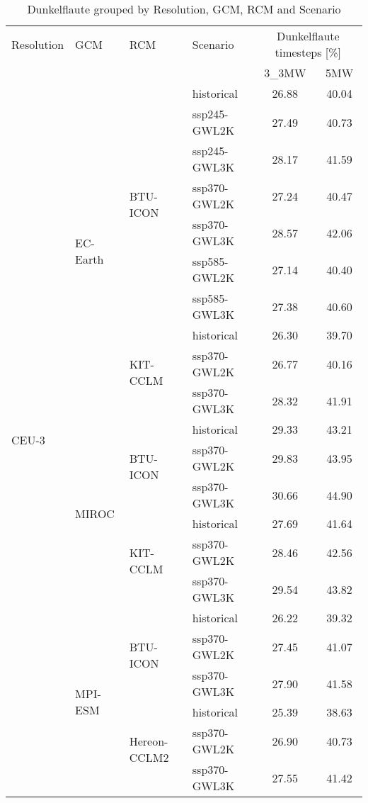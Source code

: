 \begin{table}[!htbp]
\centering
\footnotesize
\caption{Dunkelflaute grouped by Resolution, GCM, RCM and Scenario}
\label{Table:Dunkelflaute_changes}
\begin{tabular}{lll|l|cc}
\toprule
Resolution & GCM & RCM & Scenario & \multicolumn{2}{c}{Dunkelflaute timesteps [\%]} \\
 & & & & 3\_3MW & 5MW \\
\midrule
\multirow{22}{*}{CEU-3} & \multirow{10}{*}{EC-Earth} & \multirow{7}{*}{BTU-ICON} & historical & 26.88 & 40.04 \\
 &  &  & ssp245-GWL2K & 27.49 & 40.73 \\
 &  &  & ssp245-GWL3K & 28.17 & 41.59 \\
 &  &  & ssp370-GWL2K & 27.24 & 40.47 \\
 &  &  & ssp370-GWL3K & 28.57 & 42.06 \\
 &  &  & ssp585-GWL2K & 27.14 & 40.40 \\
 &  &  & ssp585-GWL3K & 27.38 & 40.60 \\
\cmidrule(lr){3-6}
 &  & \multirow{3}{*}{KIT-CCLM} & historical & 26.30 & 39.70 \\
 &  &  & ssp370-GWL2K & 26.77 & 40.16 \\
 &  &  & ssp370-GWL3K & 28.32 & 41.91 \\
\cmidrule(lr){3-6}
\cmidrule(lr){2-6}
 & \multirow{6}{*}{MIROC} & \multirow{3}{*}{BTU-ICON} & historical & 29.33 & 43.21 \\
 &  &  & ssp370-GWL2K & 29.83 & 43.95 \\
 &  &  & ssp370-GWL3K & 30.66 & 44.90 \\
\cmidrule(lr){3-6}
 &  & \multirow{3}{*}{KIT-CCLM} & historical & 27.69 & 41.64 \\
 &  &  & ssp370-GWL2K & 28.46 & 42.56 \\
 &  &  & ssp370-GWL3K & 29.54 & 43.82 \\
\cmidrule(lr){3-6}
\cmidrule(lr){2-6}
 & \multirow{6}{*}{MPI-ESM} & \multirow{3}{*}{BTU-ICON} & historical & 26.22 & 39.32 \\
 &  &  & ssp370-GWL2K & 27.45 & 41.07 \\
 &  &  & ssp370-GWL3K & 27.90 & 41.58 \\
\cmidrule(lr){3-6}
 &  & \multirow{3}{*}{Hereon-CCLM2} & historical & 25.39 & 38.63 \\
 &  &  & ssp370-GWL2K & 26.90 & 40.73 \\
 &  &  & ssp370-GWL3K & 27.55 & 41.42 \\

\end{tabular}
\end{table}
